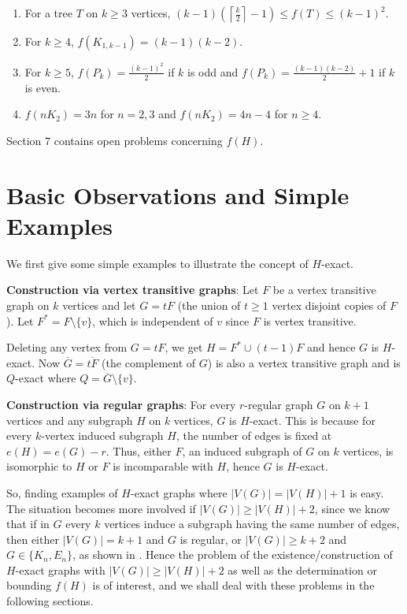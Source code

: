 \documentclass[a4paper,12pt]{article}
\begin{document}
\begin{enumerate}\item{For a tree $T$ on $k\geq 3$ vertices, $ (k - 1)(\left \lceil \frac{k}{2} \right  \rceil -1 ) \leq   f(T) \leq ( k-1)^2$.}
\item{For $k \geq 4$, $f(K_{1,k-1}) = (k -1)(k-2)$.}
\item{For $k \geq 5$, $f(P_k)=\frac{(k-1)^2}{2}$ if $k$ is odd and $f(P_k)=\frac{(k-1)(k-2)}{2}+1$ if $k$ is even.}
\item{$ f(nK_2) = 3n$ for $n = 2, 3$ and $f(nK_2) = 4n - 4$ for $n \geq 4$.}
\end{enumerate}

Section 7 contains open  problems concerning $f(H)$.

 



\section{Basic Observations and Simple Examples}

We first give some simple examples to illustrate the concept of $H$-exact.
\medskip

\noindent \textbf{Construction via vertex transitive graphs}:  Let $F$ be a vertex transitive graph on $k$ vertices and let $G = tF$ (the union of $t \ge 1$ vertex disjoint copies of $F$). Let $F^*=F \setminus \{v\}$, which is independent of $v$ since $F$ is vertex transitive. 

Deleting any vertex from $G = tF$, we get $H= F^* \cup (t-1)F$ and hence $G$ is $H$-exact. Now $\overline{G} = \overline{tF}$ (the complement of $G$) is also a vertex transitive graph and is $Q$-exact where $Q = \overline {G} \setminus \{v\}$.
 \medskip

\noindent \textbf{Construction via regular graphs}:  For every $r$-regular graph $G$ on $k+1$ vertices and any subgraph $H$ on $k$ vertices, $G$ is $H$-exact. This is because for every $k$-vertex induced subgraph $H$, the number of edges is fixed at $e(H)=e(G) - r$. Thus, either $F$, an induced subgraph of $G$ on $k$ vertices, is isomorphic to $H$ or $F$ is incomparable with $H$, hence $G$ is $H$-exact. 
\medskip

So, finding examples of $H$-exact graphs where $|V(G)| = |V(H)| +1$ is easy.  The situation becomes more involved if $|V(G)| \geq |V(H)| +2$, since we know that if in $G$ every $k$ vertices induce a subgraph having the same number of edges, then either $|V(G)| = k + 1$ and $G$ is regular, or $|V(G)| \geq k + 2$ and $ G \in \{K_n,E_n\}$, as shown in \cite{Caro1994}.  Hence the problem of the existence/construction of $H$-exact graphs with $|V(G)| \geq |V(H)| +2$ as well as the determination or bounding $f(H)$ is of interest, and we shall deal with these problems in the following sections.
\end{document}
